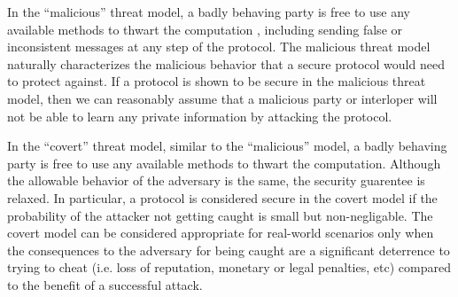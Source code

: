 In the {}``malicious'' threat model, a badly behaving party is free
to use any available methods to thwart the computation , including
sending false or inconsistent messages at any step of the protocol.
The malicious threat model naturally characterizes the malicious behavior
that a secure protocol would need to protect against. If a protocol
is shown to be secure in the malicious threat model, then we can reasonably
assume that a malicious party or interloper will not be able to learn
any private information by attacking the protocol.

In the {}``covert'' threat model, similar to the {}``malicious'' model,
a badly behaving party is free to use any available methods to thwart the computation.
Although the allowable behavior of the adversary is the same, the security
guarentee is relaxed.  In particular, a protocol is considered secure
in the covert model if the probability of the attacker not getting caught
is small but non-negligable.  The covert model can be considered appropriate
for real-world scenarios only when the consequences to the adversary for being
caught are a significant deterrence to trying to cheat (i.e. loss of reputation,
monetary or legal penalties, etc) compared to the benefit of a successful attack.
\cite{aumannlindell}

%
\begin{comment}



\end{comment}
{}
